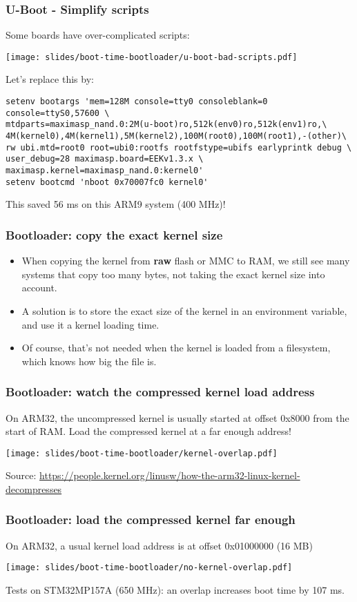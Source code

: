 \begin{frame}[fragile]
\frametitle{U-Boot - Simplify scripts}
Some boards have over-complicated scripts:
\begin{center}
    \texttt{[image: slides/boot-time-bootloader/u-boot-bad-scripts.pdf]}
\end{center}
Let's replace this by:
\begin{block}{}
\footnotesize
\begin{verbatim}
setenv bootargs 'mem=128M console=tty0 consoleblank=0
console=ttyS0,57600 \
mtdparts=maximasp_nand.0:2M(u-boot)ro,512k(env0)ro,512k(env1)ro,\
4M(kernel0),4M(kernel1),5M(kernel2),100M(root0),100M(root1),-(other)\
rw ubi.mtd=root0 root=ubi0:rootfs rootfstype=ubifs earlyprintk debug \
user_debug=28 maximasp.board=EEKv1.3.x \
maximasp.kernel=maximasp_nand.0:kernel0'
setenv bootcmd 'nboot 0x70007fc0 kernel0'
\end{verbatim}
\end{block}
This saved 56 ms on this ARM9 system (400 MHz)!
\end{frame}

\begin{frame}
\frametitle{Bootloader: copy the exact kernel size}
\begin{itemize}
\item When copying the kernel from {\bf raw} flash or MMC to RAM, we still see
      many systems that copy too many bytes, not taking the
      exact kernel size into account.
\item A solution is to store the exact size of the kernel in an environment
      variable, and use it a kernel loading time.
\item Of course, that's not needed when the kernel is loaded from a
      filesystem, which knows how big the file is.
\end{itemize}
\end{frame}

\begin{frame}
\frametitle{Bootloader: watch the compressed kernel load address}
     On ARM32, the uncompressed kernel is usually started at offset
     0x8000 from the start of RAM. Load the compressed kernel at a far
     enough address!
\vspace{0.5cm}
\begin{center}
    \texttt{[image: slides/boot-time-bootloader/kernel-overlap.pdf]}
\end{center}
\footnotesize Source: \url{https://people.kernel.org/linusw/how-the-arm32-linux-kernel-decompresses}
\end{frame}

\begin{frame}
\frametitle{Bootloader: load the compressed kernel far enough}
On ARM32, a usual kernel load address is at offset 0x01000000 (16 MB)
\begin{center}
    \texttt{[image: slides/boot-time-bootloader/no-kernel-overlap.pdf]}
\end{center}
Tests on STM32MP157A (650 MHz): an overlap increases boot time by 107 ms.
\end{frame}
